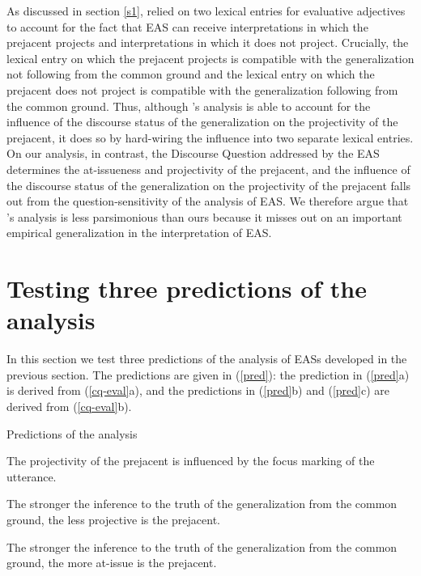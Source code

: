 \documentclass[11pt,fleqn]{article}
\newcommand{\6}{\mbox{$[\hspace*{-.6mm}[$}}
\newcommand{\9}{\mbox{$]\hspace*{-.6mm}]$}}
\newcommand{\citepos}[1]{\citeauthor{#1}'s \citeyear{#1}}
\begin{document}
As discussed in section \ref{s1}, \citet{karttunen-etal2014} relied on two lexical entries for evaluative adjectives to account for the fact that EAS can receive interpretations in which the prejacent projects and interpretations in which it does not project. Crucially, the lexical entry on which the prejacent projects is compatible with the generalization not following from the common ground and the lexical entry on which the prejacent does not project is compatible with the generalization following from the common ground. Thus, although \citepos{karttunen-etal2014} analysis is able to account for the influence of the discourse status of the generalization on the projectivity of the prejacent, it does so by hard-wiring the influence into two separate lexical entries. On our analysis, in contrast, the Discourse Question addressed by the EAS determines the at-issueness and projectivity of the prejacent, and the influence of the discourse status of the generalization on the projectivity of the prejacent falls out from the question-sensitivity of the analysis of EAS. We therefore argue that \citepos{karttunen-etal2014} analysis is less parsimonious than ours because it misses out on an important empirical generalization in the interpretation of EAS. 

\section{Testing three predictions of the analysis}\label{s4}

In this section we test three predictions of the analysis of EASs developed in the previous section. The predictions are given in (\ref{pred}): the prediction in (\ref{pred}a) is derived from (\ref{cq-eval}a), and the predictions in (\ref{pred}b) and (\ref{pred}c) are derived from (\ref{cq-eval}b).

\begin{exe}
\ex\label{pred} Predictions of the analysis 

\begin{xlist}

\ex The projectivity of the prejacent is influenced by the focus marking of the utterance.

\ex The stronger the inference to the truth of the generalization from the common ground, the less projective is the prejacent.

\ex The stronger the inference to the truth of the generalization from the common ground, the more at-issue is the prejacent.

\end{xlist}
\end{exe}
\end{document}
